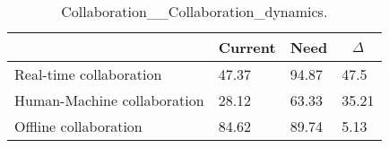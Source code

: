 
  \begin{table*}[]
  \centering
  \notsotiny
  \caption{ Collaboration__Collaboration_dynamics.}
\label{tab:collaboration__collaboration_dynamics}
\begin{tabular}{|l|l|l|l|}
  \hline
  \rowcolor[HTML]{C0C0C0}
    \multicolumn{1}{|c|}{Feature} & \multicolumn{1}{c|}{Current} & \multicolumn{1}{c|}{Need} & \multicolumn{1}{c|}{$\Delta$} \\ \hline
  Real-time collaboration & 47.37 & 94.87 & 47.5 \\ \hline 
Human-Machine collaboration & 28.12 & 63.33 & 35.21 \\ \hline 
Offline collaboration & 84.62 & 89.74 & 5.13 \\ \hline 
\end{tabular}%
  \end{table*}